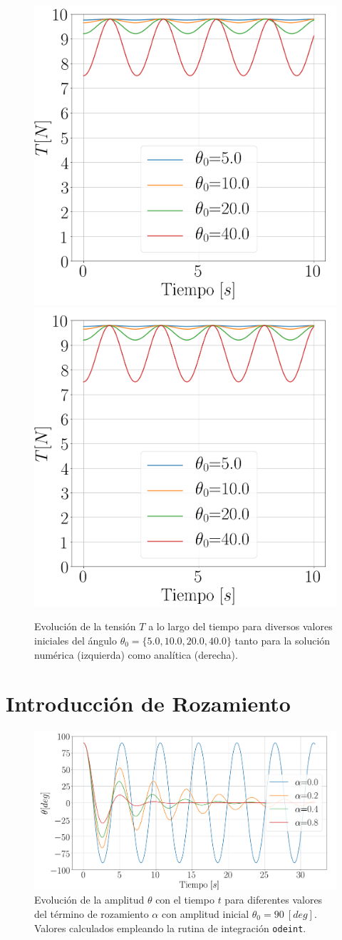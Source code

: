 \documentclass[journal]{IEEEtran}
\begin{document}
\begin{figure}[!htb]
  \centering
  \includegraphics[width=0.49\linewidth]{tension_diff}
  \includegraphics[width=0.49\linewidth]{tension_diff_approx}
  \caption{Evolución de la tensión $T$ a lo largo del tiempo para diversos valores iniciales del ángulo $\theta_0 = \{5.0, 10.0, 20.0, 40.0\}$ tanto para la solución numérica (izquierda) como analítica (derecha).}
  \label{fig:tensiones_diff}
\end{figure}

\section{Introducción de Rozamiento}

\begin{figure}[!htb]
  \centering
  \includegraphics[width=\linewidth]{alpha}
  \caption{Evolución de la amplitud $\theta$ con el tiempo $t$ para diferentes valores del término de rozamiento $\alpha$ con amplitud inicial $\theta_0=90~[deg]$. Valores calculados empleando la rutina de integración \texttt{odeint}.}
  \label{fig:alpha}
\end{figure}
\end{document}
